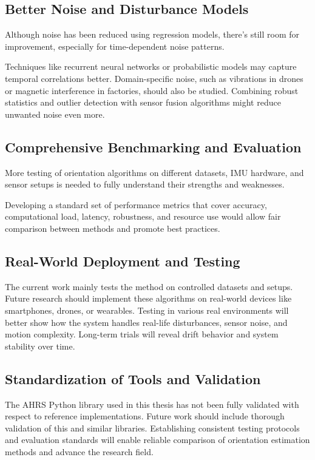 \documentclass{iutbscthesis}
\begin{document}
\subsection{Better Noise and Disturbance Models}

Although noise has been reduced using regression models, there's still room for improvement, especially for time-dependent noise patterns.

Techniques like recurrent neural networks or probabilistic models may capture temporal correlations better. Domain-specific noise, such as vibrations in drones or magnetic interference in factories, should also be studied. Combining robust statistics and outlier detection with sensor fusion algorithms might reduce unwanted noise even more.

\subsection{Comprehensive Benchmarking and Evaluation}

More testing of orientation algorithms on different datasets, IMU hardware, and sensor setups is needed to fully understand their strengths and weaknesses.

Developing a standard set of performance metrics that cover accuracy, computational load, latency, robustness, and resource use would allow fair comparison between methods and promote best practices.

\subsection{Real-World Deployment and Testing}

The current work mainly tests the method on controlled datasets and setups. Future research should implement these algorithms on real-world devices like smartphones, drones, or wearables. Testing in various real environments will better show how the system handles real-life disturbances, sensor noise, and motion complexity. Long-term trials will reveal drift behavior and system stability over time.

\subsection{Standardization of Tools and Validation}

The AHRS Python library used in this thesis has not been fully validated with respect to reference implementations. Future work should include thorough validation of this and similar libraries. Establishing consistent testing protocols and evaluation standards will enable reliable comparison of orientation estimation methods and advance the research field.
\end{document}
